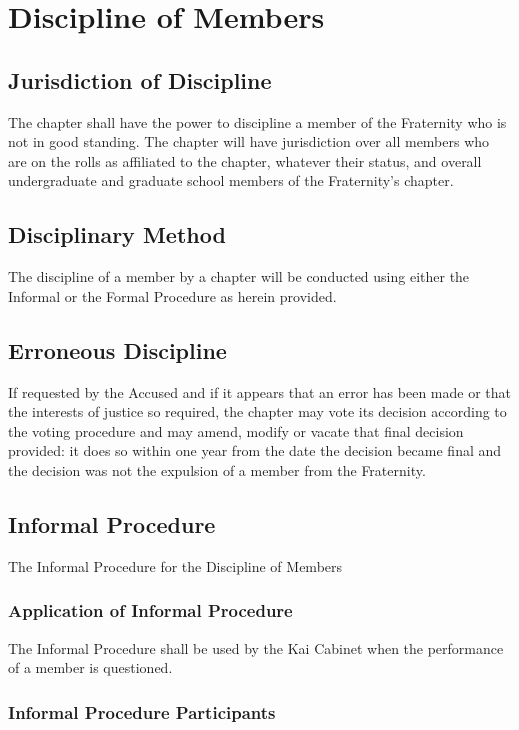 \chapter{Discipline of Members}
\label{cha:discipline-of-members}

\section{Jurisdiction of Discipline}

The chapter shall have the power to discipline a member of the Fraternity who
is not in good standing.
The chapter will have jurisdiction over all members who are on the rolls as
affiliated to the chapter, whatever their status, and overall undergraduate and
graduate school members of the Fraternity’s chapter.

\section{Disciplinary Method}

The discipline of a member by a chapter will be conducted using either the
Informal or the Formal Procedure as herein provided.

\section{Erroneous Discipline}
If requested by the Accused and if it appears that an error has been made or
that the interests of justice so required, the chapter may vote its decision
according to the voting procedure and may amend, modify or vacate that final
decision provided: it does so within one year from the date the decision became
final and the decision was not the expulsion of a member from the Fraternity.

\section{Informal Procedure}

The Informal Procedure for the Discipline of Members

\subsection{Application of Informal Procedure}

The Informal Procedure shall be used by the Kai Cabinet when the performance of
a member is questioned.

\subsection{Informal Procedure Participants}

